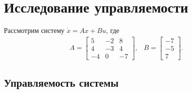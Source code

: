 \section{Исследование управляемости}

Рассмотрим систему $\dot{x} = Ax + Bu$, где 
\begin{equation}
    \begin{array}{cc}
        A = \begin{bmatrix}
            5 & -2 & 8 \\
            4 & -3 & 4 \\
            -4 & 0 & -7
        \end{bmatrix}, &
        B = \begin{bmatrix}
            -7 \\
            -5 \\
            7
        \end{bmatrix}.
    \end{array}
\end{equation}

\subsection{Управляемость системы}

